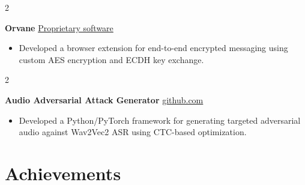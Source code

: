 \documentclass[10pt, a4paper]{article}
\newenvironment{highlights}{
    \begin{itemize}[
        topsep=0.10 cm,
        parsep=0.10 cm,
        partopsep=0pt,
        itemsep=0pt,
        leftmargin=0 cm + 10pt
    ]
}{
    \end{itemize}
} %
\newenvironment{twocolentry}[2][]{
    \onecolentry
    \def\secondColumn{#2}
    \setcolumnwidth{\fill, 4.5 cm}
    \begin{paracol}{2}
}{
    \switchcolumn \raggedleft \secondColumn
    \end{paracol}
    \endonecolentry
} %
\begin{document}
            \begin{twocolentry}{
            \href{https://github.com/TimsTittus/Orvane}{Proprietary software}
        }
            \textbf{Orvane}\end{twocolentry}

        \vspace{0.01 cm}
        
            \begin{highlights}
                \item Developed a browser extension for end-to-end encrypted messaging using custom AES encryption and ECDH key exchange.

            \end{highlights}

        \vspace{0.01 cm}
        
            \begin{twocolentry}{
            \href{https://github.com/TimsTittus/Audio-Adversarial-Attack-Generator}{github.com}
        }
            \textbf{Audio Adversarial Attack Generator}\end{twocolentry}

        \vspace{0.01 cm}
        
            \begin{highlights}
                \item Developed a Python/PyTorch framework for generating targeted adversarial audio against Wav2Vec2 ASR using CTC-based optimization.
            \end{highlights}

    \section{Achievements}
    
\end{document}
